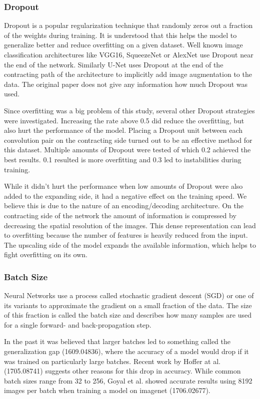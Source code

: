 \subsubsection{Dropout}

Dropout is a popular regularization technique that randomly zeros out a fraction of the weights during training. It is understood that this helps the model to generalize better and reduce overfitting on a given dataset. Well known image classification architectures like VGG16, SqueezeNet or AlexNet use Dropout near the end of the network. Similarly U-Net uses Dropout at the end of the contracting path of the architecture to implicitly add image augmentation to the data. The original paper does not give any information how much Dropout was used.

Since overfitting was a big problem of this study, several other Dropout strategies were investigated. Increasing the rate above 0.5 did reduce the overfitting, but also hurt the performance of the model. Placing a Dropout unit between each convolution pair on the contracting side turned out to be an effective method for this dataset. Multiple amounts of Dropout were tested of which 0.2 achieved the best results. 0.1 resulted is more overfitting and 0.3 led to instabilities during training.

While it didn't hurt the performance when low amounts of Dropout were also added to the expanding side, it had a negative effect on the training speed. We believe this is due to the nature of an encoding/decoding architecture. On the contracting side of the network the amount of information is compressed by decreasing the spatial resolution of the images. This dense representation can lead to overfitting because the number of features is heavily reduced from the input. The upscaling side of the model expands the available information, which helps to fight overfitting on its own.


\subsubsection{Batch Size}

Neural Networks use a process called stochastic gradient descent (SGD) or one of its variants to approximate the gradient on a small fraction of the data. The size of this fraction is called the batch size and describes how many samples are used for a single forward- and back-propagation step.

In the past it was believed that larger batches led to something called the generalization gap (1609.04836), where the accuracy of a model would drop if it was trained on particularly large batches. Recent work by Hoffer at al. (1705.08741) suggests other reasons for this drop in accuracy. While common batch sizes range from 32 to 256, Goyal et al. showed accurate results using 8192 images per batch when training a model on imagenet (1706.02677).

